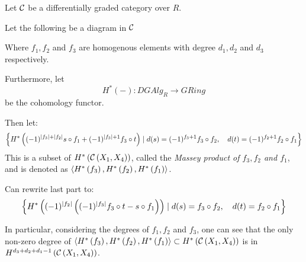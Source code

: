 \begin{definition}
    Let \( {\mathcal{C}} \) be a differentially graded category over \( R \).

    Let the following be a diagram in \( {\mathcal{C}} \)
    \begin{center}
    \end{center}

    Where \( f_1, f_2 \) and \( f_3 \) are homogenous elements with degree \( d_1, d_2 \) and \( d_3 \) respectively.

    Furthermore, let
    \[
        H^*(-): DGAlg_R \to GRing
    \]
    be the cohomology functor.

    Then let:
    \[
        \left\{ 
            H^* \left( 
                (-1)^{\lvert f_3 \rvert + \lvert f_2 \rvert}s \circ f_1 + (-1)^{\lvert f_3 \rvert + 1} f_3 \circ t
             \right)
            \mid
            d(s) = (-1)^{f_3 + 1} f_3 \circ f_2, \quad
            d(t) = (-1)^{f_2 + 1} f_2 \circ f_1
         \right\}
    \]
    This is a subset of \( H^* \left( {\mathcal{C}} \left( X_1, X_4 \right) \right) \), called the \emph{Massey product of \( f_3, f_2 \) and \( f_1 \)}, and is denoted as \( \langle H^* \left( f_3 \right), H^* \left( f_2 \right), H^* \left( f_1 \right)  \rangle \).
\end{definition}

Can rewrite last part to:
\[
    \left\{ 
        H^* \left( 
             (-1)^{\lvert f_2 \rvert} \left(  (-1)^{\lvert f_3 \rvert} f_3 \circ t - s \circ f_1  \right)
         \right)
        \mid
        d(s) = f_3 \circ f_2, \quad
        d(t) = f_2 \circ f_1
     \right\}
\]

\begin{remark}
    In particular, considering the degrees of \( f_1, f_2 \) and \( f_3 \), one can see that the only non-zero degree of \( \langle H^* \left( f_3 \right), H^* \left( f_2 \right), H^* \left( f_1 \right)  \rangle \subset H^* \left( {\mathcal{C}} \left( X_1, X_4 \right) \right) \) is in \( H^{d_3 + d_2 + d_1 - 1} \left( {\mathcal{C}} \left( X_1, X_4 \right) \right) \).
\end{remark}

